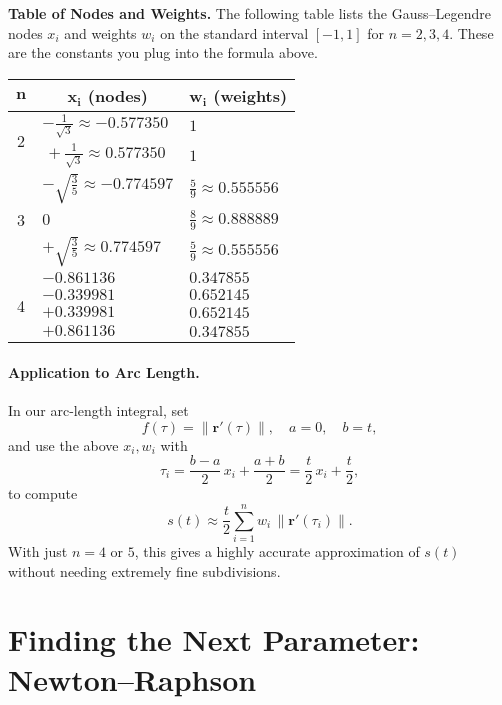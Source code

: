 \documentclass[11pt]{article}
\begin{document}
\bigskip
\noindent\textbf{Table of Nodes and Weights.}%
\quad The following table lists the Gauss–Legendre nodes \(x_i\) and weights \(w_i\) on the standard interval \([-1,1]\) for \(n=2,3,4\). These are the constants you plug into the formula above.

\begin{center}
\begin{tabular}{cll}
\toprule
\multicolumn{1}{c}{\(\boldsymbol{n}\)} & \multicolumn{1}{c}{\(\boldsymbol{x_i}\) (nodes)} 
                                       & \multicolumn{1}{c}{\(\boldsymbol{w_i}\) (weights)} \\
\midrule
\multirow{2}{*}{2} & \(-\tfrac{1}{\sqrt{3}}\approx -0.577350\) & \(1\) \\
                   & \(\,+\tfrac{1}{\sqrt{3}}\approx  0.577350\) & \(1\) \\
\midrule
\multirow{3}{*}{3} & \(-\sqrt{\tfrac{3}{5}}\approx -0.774597\)  & \(\tfrac{5}{9}\approx0.555556\) \\
                   & \(0\)                                       & \(\tfrac{8}{9}\approx0.888889\) \\
                   & \(+\sqrt{\tfrac{3}{5}}\approx  0.774597\)  & \(\tfrac{5}{9}\approx0.555556\) \\
\midrule
\multirow{4}{*}{4} & \(-0.861136\) & \(0.347855\) \\
                   & \(-0.339981\) & \(0.652145\) \\
                   & \(+0.339981\) & \(0.652145\) \\
                   & \(+0.861136\) & \(0.347855\) \\
\bottomrule
\end{tabular}
\end{center}

\paragraph{Application to Arc Length.}%
In our arc-length integral, set 
\[
f(\tau)=\|\mathbf r'(\tau)\|,
\quad
a=0,\quad b=t,
\]
and use the above \(x_i,w_i\) with
\[
\tau_i = \frac{b-a}{2}\,x_i + \frac{a+b}{2}
         = \frac{t}{2}\,x_i + \frac{t}{2},
\]
to compute
\[
s(t) \approx \frac{t}{2}\sum_{i=1}^n w_i\,\|\mathbf r'(\tau_i)\|.
\]
With just \(n=4\) or \(5\), this gives a highly accurate approximation of \(s(t)\) without needing extremely fine subdivisions.


\section{Finding the Next Parameter: Newton–Raphson}
\end{document}
